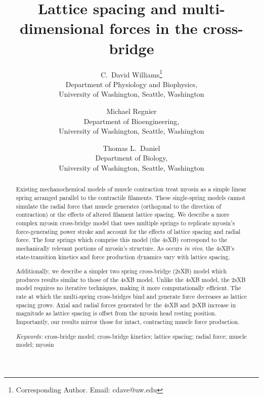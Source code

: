 \documentclass[11pt,titlepage]{article}
\title{Lattice spacing and multi-dimensional forces in the cross-bridge}
\author{C.~David Williams\thanks{
            Corresponding Author. 
            Email: cdave@uw.edu }\\ 
        Department of Physiology and Biophysics, \\
        University of Washington, Seattle, Washington
        \and Michael Regnier \\
        Department of Bioengineering, \\
        University of Washington, Seattle, Washington
        \and Thomas L.\ Daniel\\
        Department of Biology, \\
        University of Washington, Seattle, Washington
        }
\date{}
\begin{document}
\maketitle{}

\begin{abstract} 
Existing mechanochemical models of muscle contraction treat myosin as a simple linear spring arranged parallel to the contractile filaments.
These single-spring models cannot simulate the radial force that muscle generates (orthogonal to the direction of contraction) or the effects of altered filament lattice spacing. 
We describe a more complex myosin cross-bridge model that uses multiple springs to replicate myosin's force-generating power stroke and account for the effects of lattice spacing and radial force. 
The four springs which comprise this model (the 4sXB) correspond to the mechanically relevant portions of myosin's structure.
As occurs \emph{in vivo}, the 4sXB's state-transition kinetics and force production dynamics vary with lattice spacing.

Additionally, we describe a simpler two spring cross-bridge (2sXB) model which produces results similar to those of the 4sXB model.
Unlike the 4sXB model, the 2sXB model requires no iterative techniques, making it more computationally efficient.
The rate at which the multi-spring cross-bridges bind and generate force decreases as lattice spacing grows. 
Axial and radial forces generated by the 4sXB and 2sXB increase in magnitude as lattice spacing is offset from the myosin head resting position. 
Importantly, our results mirror those for intact, contracting muscle force production.

\emph{Keywords:} cross-bridge model; cross-bridge kinetics; lattice spacing; radial force; muscle model; myosin 
\end{abstract}

\clearpage

\end{document}
